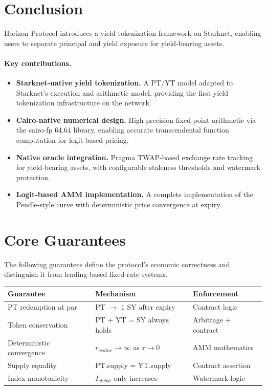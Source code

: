 
\section{Conclusion}

Horizon Protocol introduces a yield tokenization framework on Starknet, enabling users to separate principal and yield exposure for yield-bearing assets.

\paragraph{Key contributions.}
\begin{itemize}
\item \textbf{Starknet-native yield tokenization.} A PT/YT model adapted to Starknet's execution and arithmetic model, providing the first yield tokenization infrastructure on the network.

\item \textbf{Cairo-native numerical design.} High-precision fixed-point arithmetic via the cairo-fp 64.64 library, enabling accurate transcendental function computation for logit-based pricing.

\item \textbf{Native oracle integration.} Pragma TWAP-based exchange rate tracking for yield-bearing assets, with configurable staleness thresholds and watermark protection.

\item \textbf{Logit-based AMM implementation.} A complete implementation of the Pendle-style curve with deterministic price convergence at expiry.
\end{itemize}


\section{Core Guarantees}

The following guarantees define the protocol's economic correctness and distinguish it from lending-based fixed-rate systems.

\begin{center}
\begin{tabular}{l l l}
\toprule
\textbf{Guarantee} & \textbf{Mechanism} & \textbf{Enforcement} \\
\midrule
PT redemption at par & PT $\to$ 1 SY after expiry & Contract logic \\
Token conservation & PT + YT = SY always holds & Arbitrage + contract \\
Deterministic convergence & $r_{scalar} \to \infty$ as $\tau \to 0$ & AMM mathematics \\
Supply equality & PT.supply = YT.supply & Contract assertion \\
Index monotonicity & $I_{global}$ only increases & Watermark logic \\
\bottomrule
\end{tabular}
\end{center}

